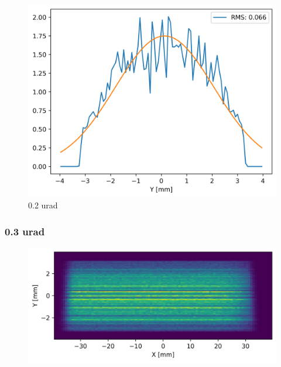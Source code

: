 \begin{figure}[H]
\centering
\includegraphics[width=0.9\linewidth]{./../figures/slope_error/WB4C_d30_d-spacing_gradient_45keV_slope_error02urad_Yprofile.png}
\caption{0.2 urad}
\label{fig:02urad}
\end{figure}

\clearpage
\subsubsection{0.3 urad}
\begin{figure}[H]
\centering
\includegraphics[width=0.9\linewidth]{./../figures/slope_error/WB4C_d30_d-spacing_gradient_45keV_slope_error03urad.png}
\end{figure}

